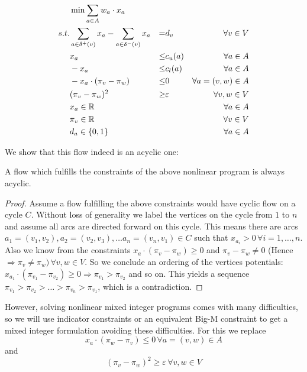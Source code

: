 \begin{align*}
  &\min \sum_{a\in A} w_a\cdot x_a & \\
 s.t. & \sum_{a\in \delta^+(v)}x_a - \sum_{a\in\delta^- (v)}x_a &=& d_v\ &\forall v\in V \\
 & x_a &\le& c_u(a) & \forall a\in A\\
 & -x_a &\le& c_l(a) & \forall a\in A\\
 & -x_a\cdot (\pi_v -\pi_w)&\le& 0 &\forall a=(v,w)\in A\\
 & (\pi_v - \pi_w)^2 &\ge& \varepsilon &\forall v,w \in V\\
 & x_a \in \mathbb{R} & & &\forall a\in A\\
 & \pi_v \in \mathbb{R} & & & \forall v\in V\\
 & d_a \in \{0,1\} & & &\forall a\in A\\
\end{align*}

We show that this flow indeed is an acyclic one:

\begin{prop}
 A flow which fulfills the constraints of the above nonlinear program is always acyclic.
\end{prop}
\begin{proof}
 Assume a flow fulfilling the above constraints would have cyclic flow on a cycle $C$. Without loss of generality 
we label the vertices on the cycle from $1$ to $n$ and assume all arcs are directed forward on this cycle. This means 
there are arcs $a_1=(v_1,v_2),a_2=(v_2,v_3), \dots a_n=(v_n, v_1)\in C$ such that $x_{a_i} > 0 \,\forall i={1,\dots , 
n}$. Also we know from the constraints  $x_a\cdot (\pi_v -\pi_w)\ge 0$ and $\pi_v - \pi_w \neq 0$ (Hence $\Rightarrow 
\pi_v\neq\pi_w)\, \forall v,w\in V$. So we conclude an ordering of the vertices potentials: $x_{a_1}\cdot (\pi_{v_1} 
-\pi_{v_2})\ge 0 \Rightarrow \pi_{v_1}>\pi_{v_2}$ and so on. This yields a sequence $\pi_{v_1}>\pi_{v_2}>\dots 
>\pi_{v_n}>\pi_{v_1}$, which is a contradiction. \lightning
\end{proof}

However, solving nonlinear mixed integer programs comes with many difficulties, so we will use indicator constraints 
or an equivalent Big-M constraint to get a mixed integer formulation avoiding these difficulties. For this we  replace 
$$x_a\cdot (\pi_w -\pi_v)\le 0 \,\forall a=(v,w)\in A $$ and $$(\pi_v - \pi_w)^2 \ge \varepsilon \,\forall v,w \in V$$

